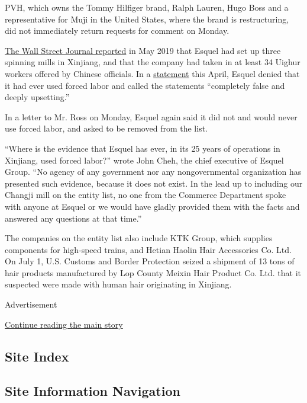 PVH, which owns the Tommy Hilfiger brand, Ralph Lauren, Hugo Boss and a
representative for Muji in the United States, where the brand is
restructuring, did not immediately return requests for comment on
Monday.

\href{https://www.wsj.com/articles/western-companies-get-tangled-in-chinas-muslim-clampdown-11558017472}{The
Wall Street Journal reported} in May 2019 that Esquel had set up three
spinning mills in Xinjiang, and that the company had taken in at least
34 Uighur workers offered by Chinese officials. In a
\href{https://www.esquel.com/news/esquel-opposes-use-forced-labor}{statement}
this April, Esquel denied that it had ever used forced labor and called
the statements ``completely false and deeply upsetting.''

In a letter to Mr. Ross on Monday, Esquel again said it did not and
would never use forced labor, and asked to be removed from the list.

``Where is the evidence that Esquel has ever, in its 25 years of
operations in Xinjiang, used forced labor?'' wrote John Cheh, the chief
executive of Esquel Group. ``No agency of any government nor any
nongovernmental organization has presented such evidence, because it
does not exist. In the lead up to including our Changji mill on the
entity list, no one from the Commerce Department spoke with anyone at
Esquel or we would have gladly provided them with the facts and answered
any questions at that time.''

The companies on the entity list also include KTK Group, which supplies
components for high-speed trains, and Hetian Haolin Hair Accessories Co.
Ltd. On July 1, U.S. Customs and Border Protection seized a shipment of
13 tons of hair products manufactured by Lop County Meixin Hair Product
Co. Ltd. that it suspected were made with human hair originating in
Xinjiang.

Advertisement

\protect\hyperlink{after-bottom}{Continue reading the main story}

\hypertarget{site-index}{%
\subsection{Site Index}\label{site-index}}

\hypertarget{site-information-navigation}{%
\subsection{Site Information
Navigation}\label{site-information-navigation}}

